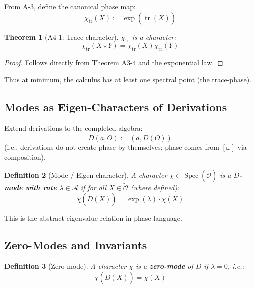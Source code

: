 \documentclass[12pt, oneside]{article}
\newtheorem{theorem}{Theorem}[section]
\newtheorem{definition}[theorem]{Definition}
\DeclareMathOperator{\tr}{tr}
\DeclareMathOperator{\Spec}{Spec}
\newcommand{\A}{\mathcal{A}}
\newcommand{\Opr}{\mathcal{O}}
\newcommand{\wtilde}{\widetilde}
\begin{document}
From A-3, define the canonical phase map:
\begin{equation}
\chi_{\tr}(X) := \exp(\wtilde{\tr}(X))
\end{equation}

\begin{theorem}[A4-1: Trace character]
$\chi_{\tr}$ is a character:
\begin{equation}
\chi_{\tr}(X \star Y) = \chi_{\tr}(X) \chi_{\tr}(Y)
\end{equation}
\end{theorem}

\begin{proof}
Follows directly from Theorem A3-4 and the exponential law.
\end{proof}

Thus at minimum, the calculus has at least one spectral point (the trace-phase).

\subsection{Modes as Eigen-Characters of Derivations}

Extend derivations to the completed algebra:
\begin{equation}
\wtilde{D}(a, O) := (a, D(O))
\end{equation}
(i.e., derivations do not create phase by themselves; phase comes from $[\omega]$ via composition).

\begin{definition}[Mode / Eigen-character]
A character $\chi \in \Spec(\wtilde{\Opr})$ is a \textbf{$D$-mode with rate $\lambda \in \A$} if for all $X \in \wtilde{\Opr}$ (where defined):
\begin{equation}
\chi(\wtilde{D}(X)) = \exp(\lambda) \cdot \chi(X)
\end{equation}
\end{definition}

This is the abstract eigenvalue relation in phase language.

\subsection{Zero-Modes and Invariants}

\begin{definition}[Zero-mode]
A character $\chi$ is a \textbf{zero-mode} of $D$ if $\lambda = 0$, i.e.:
\begin{equation}
\chi(\wtilde{D}(X)) = \chi(X)
\end{equation}
\end{definition}
\end{document}
